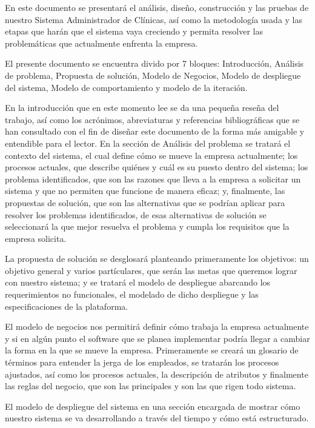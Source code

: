 
En este documento se presentará el análisis, diseño, construcción y las pruebas de nuestro Sistema Administrador de Clínicas, así como la metodología usada y las etapas que harán que el sistema vaya creciendo y permita resolver las problemáticas que actualmente enfrenta la empresa.

El presente documento se encuentra divido por 7 bloques: Introducción, Análisis de problema, Propuesta de solución, Modelo de Negocios, Modelo de despliegue del sistema, Modelo de comportamiento y modelo de la iteración.

En la introducción que en este momento lee se da una pequeña reseña del trabajo, así como los acrónimos, abreviaturas y referencias bibliográficas que se han consultado con el fin de diseñar este documento de la forma más amigable y entendible para el lector.
En la sección de Análisis del problema se tratará el contexto del sistema, el cual define cómo se mueve la empresa actualmente; los procesos actuales, que describe quiénes y cuál es su puesto dentro del sistema; los problema identificados, que son las razones que lleva a la empresa a solicitar un sistema y que no permiten que funcione de manera eficaz; y, finalmente, las propuestas de solución, que son las alternativas que se podrían aplicar para resolver los problemas identificados, de esas alternativas de solución se seleccionará la que mejor resuelva el problema y cumpla los requisitos que la empresa solicita.

La propuesta de solución se desglosará planteando primeramente los objetivos: un objetivo general y varios partículares, que serán las metas que queremos lograr con nuestro sistema; y se tratará el modelo de despliegue abarcando los requerimientos no funcionales, el modelado de dicho despliegue y las especificaciones de la plataforma.

El modelo de negocios nos permitirá definir cómo trabaja la empresa actualmente y si en algún punto el software que se planea implementar podría llegar a cambiar la forma en la que se mueve la empresa. Primeramente se creará un glosario de términos para entender la jerga de los empleados, se tratarán los procesos ajustados, así como los procesos actuales, la descripción de atributos y finalmente las reglas del negocio, que son las principales y son las que rigen todo sistema.

El modelo de despliegue del sistema en una sección encargada de mostrar cómo nuestro sistema se va desarrollando a través del tiempo y cómo está estructurado.

